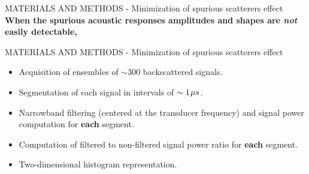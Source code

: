 \documentclass[handout]{beamer}
\newcommand\Fontable{\fontsize{9}{10}\selectfont}
\begin{document}
\begin{frame}{MATERIALS AND METHODS - Minimization of spurious scatterers effect}
\vspace{3px}
 {\bf When the spurious acoustic responses amplitudes and shapes are \textit{not} easily detectable,} 

\end{frame}

\begin{frame}{MATERIALS AND METHODS - Minimization of spurious scatterers effect}
\Fontable
\begin{minipage}[c]{1\linewidth}
\begin{minipage}[c]{0.46\linewidth}
\begin{itemize}
\item<2-> Acquisition of ensembles of $\sim 300$ backscattered signals. 
\item<2-> Segmentation of each signal in intervals of $\sim 1\hspace{1px}\mu s$.

\vspace{2pc}
\item<3-> Narrowband filtering (centered at the transducer frequency) and signal power computation for \textbf{each} segment.
\item<3-> Computation of filtered to non-filtered signal power ratio for \textbf{each} segment.
\item<4-> Two-dimensional histogram representation.
\end{itemize}

\end{minipage}
\begin{minipage}[c]{0.55\linewidth}


\end{minipage}
\end{minipage}
\end{frame}
\end{document}
